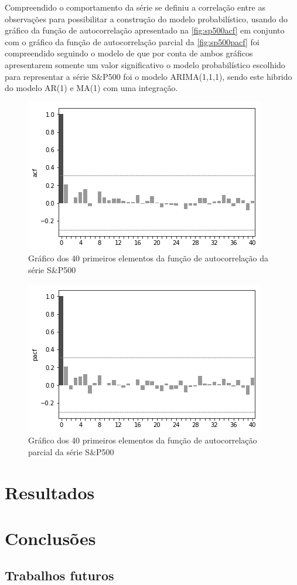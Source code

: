 \documentclass[
    12pt,
    oneside,
    a4paper,
    english,
    brazil
]{abntex2}
\begin{document}

Compreendido  o  comportamento  da  série  se definiu  a  correlação  entre  as
observações para possibilitar a construção  do modelo probabilístico, usando do
gráfico  da  função  de autocorrelação  apresentado  na  \autoref{fig:sp500acf}
em   conjunto  com   o  gráfico   da  função   de  autocorrelação   parcial  da
\autoref{fig:sp500pacf} foi compreendido seguindo  o modelo de 
que por conta  de ambos gráficos apresentarem somente um  valor significativo o
modelo probabilístico escolhido  para representar a série S\&P500  foi o modelo
ARIMA(1,1,1), sendo este hibrido do modelo AR(1) e MA(1) com uma integração.

\begin{figure}[ht]
    \centering
    \caption{Gráfico dos 40 primeiros elementos da função de autocorrelação da
    série S\&P500}\label{fig:sp500acf}
    \includegraphics[width=.5\linewidth]{images/sp500acf.png}
\end{figure}

\begin{figure}[ht]
    \centering
    \caption{Gráfico  dos 40  primeiros elementos  da função  de autocorrelação
    parcial da série S\&P500}\label{fig:sp500pacf}
    \includegraphics[width=.5\linewidth]{images/sp500pacf.png}
\end{figure}

\chapter{Resultados}\label{chap:result}

\chapter{Conclusões}\label{chap:concl}



\section{Trabalhos futuros}

\postextual


\end{document}
